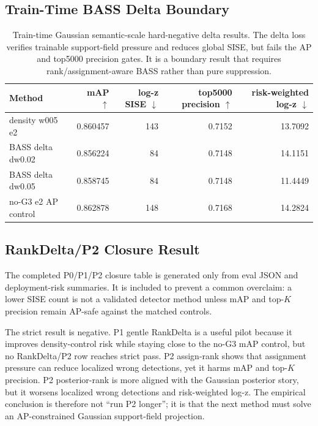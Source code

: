 \documentclass[10pt]{article}
\begin{document}
\subsection{Train-Time BASS Delta Boundary}

\begin{table}[h]
\centering
\small
\begin{tabular}{lrrrr}
\toprule
Method & mAP $\uparrow$ & log-z SISE $\downarrow$ & top5000 precision $\uparrow$ & risk-weighted log-z $\downarrow$ \\
\midrule
density w005 e2 & 0.860457 & 143 & 0.7152 & 13.7092 \\
BASS delta dw0.02 & 0.856224 & 84 & 0.7148 & 14.1151 \\
BASS delta dw0.05 & 0.858745 & 84 & 0.7148 & 11.4449 \\
no-G3 e2 AP control & 0.862878 & 148 & 0.7168 & 14.2824 \\
\bottomrule
\end{tabular}
\caption{Train-time Gaussian semantic-scale hard-negative delta results.  The
delta loss verifies trainable support-field pressure and reduces global SISE,
but fails the AP and top5000 precision gates.  It is a boundary result that
requires rank/assignment-aware BASS rather than pure suppression.}
\end{table}

\subsection{RankDelta/P2 Closure Result}

The completed P0/P1/P2 closure table is generated only from eval JSON and
deployment-risk summaries.  It is included to prevent a common overclaim: a
lower SISE count is not a validated detector method unless mAP and top-$K$
precision remain AP-safe against the matched controls.



The strict result is negative.  P1 gentle RankDelta is a useful pilot because
it improves density-control risk while staying close to the no-G3 mAP control,
but no RankDelta/P2 row reaches strict pass.  P2 assign-rank shows that
assignment pressure can reduce localized wrong detections, yet it harms mAP and
top-$K$ precision.  P2 posterior-rank is more aligned with the Gaussian
posterior story, but it worsens localized wrong detections and risk-weighted
log-z.  The empirical conclusion is therefore not ``run P2 longer''; it is that
the next method must solve an AP-constrained Gaussian support-field projection.
\end{document}
